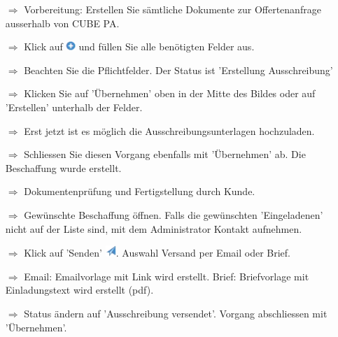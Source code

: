 \documentclass{article}
\begin{document}
\begin{multicols}{2}

\begin{tcolorbox}[colback=blue!5,colframe=blue!40!black,title=(1) Neue Beschaffung initialisieren]
\begin{itemize}
  \item[$\Longrightarrow$] Vorbereitung: Erstellen Sie sämtliche Dokumente zur Offertenanfrage ausserhalb von CUBE PA.
  \item[$\Longrightarrow$] Klick auf \includegraphics[height=10pt]{Icons/Plussymbol.png} und füllen Sie alle benötigten Felder aus.
  \item[$\Longrightarrow$] Beachten Sie die Pflichtfelder. Der Status ist 'Erstellung Ausschreibung'
  \item[$\Longrightarrow$] Klicken Sie auf 'Übernehmen' oben in der Mitte des Bildes oder auf 'Erstellen' unterhalb der Felder.
	\item[$\Longrightarrow$] Erst jetzt ist es möglich die Ausschreibungsunterlagen hochzuladen.
  \item[$\Longrightarrow$] Schliessen Sie diesen Vorgang ebenfalls mit 'Übernehmen' ab. Die Beschaffung wurde erstellt.
	\item[$\Longrightarrow$] Dokumentenprüfung und Fertigstellung durch Kunde.
\end{itemize}
\end{tcolorbox}


\begin{tcolorbox}[colback=blue!5,colframe=blue!40!black,title=(2) Offertanfrage versenden]
\begin{itemize}
  \item[$\Longrightarrow$] Gewünschte Beschaffung öffnen. Falls die gewünschten 'Eingeladenen' nicht auf der Liste sind, mit dem Administrator Kontakt aufnehmen.
	\item[$\Longrightarrow$] Klick auf 'Senden' \includegraphics[height=12pt]{Icons/Versandsymbol.png}. Auswahl Versand per Email oder Brief.
  \item[$\Longrightarrow$] Email: Emailvorlage mit Link wird erstellt. Brief: Briefvorlage mit Einladungstext wird erstellt (pdf).
  \item[$\Longrightarrow$] Status ändern auf 'Ausschreibung versendet'. Vorgang abschliessen mit 'Übernehmen'.
\end{itemize}
\end{tcolorbox}


\end{multicols}
\end{document}
